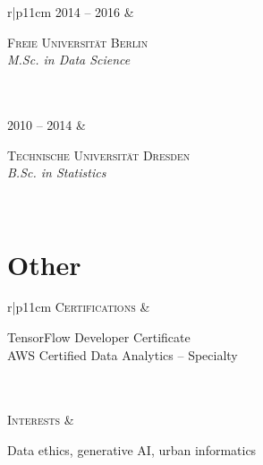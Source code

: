 \documentclass[11pt,a4paper]{article}
\begin{document}
\begin{flushright}
\begin{tabular}{r|p{11cm}}
\textsc{2014 -- 2016} & \begin{minipage}[t]{\linewidth} \textsc{Freie Universität Berlin}\\\emph{M.Sc. in Data Science} \end{minipage} \\
 \\
\textsc{2010 -- 2014} & \begin{minipage}[t]{\linewidth} \textsc{Technische Universität Dresden}\\\emph{B.Sc. in Statistics} \end{minipage} \\
\end{tabular}
\end{flushright}

\section*{Other}\label{other}

\begin{flushright}
\begin{tabular}{r|p{11cm}}
\textsc{Certifications} & \begin{minipage}[t]{\linewidth} TensorFlow Developer Certificate\\
AWS Certified Data Analytics -- Specialty \end{minipage} \\
 \\
\textsc{Interests} & \begin{minipage}[t]{\linewidth} Data ethics, generative AI, urban informatics \end{minipage} \\
\end{tabular}
\end{flushright}
\end{document}
